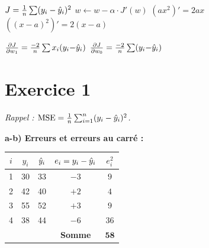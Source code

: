 %






\setlength{\parskip}{2pt}
\setlength{\abovedisplayskip}{5pt}
\setlength{\belowdisplayskip}{5pt}

\begin{tcolorbox}[
    enhanced, colback=ipssiCyan!5, colframe=ipssiCyan!50,
    boxrule=0.8pt, arc=4pt,
    title={\sffamily\bfseries Rappels --- Formules utilis\'{e}es},
    coltitle=white, colbacktitle=ipssiCyan!70,
]
\small
$J = \frac{1}{n}\sum(y_i - \hat{y}_i)^2$ \hfill
$w \leftarrow w - \alpha \cdot J'(w)$ \hfill
$(ax^2)' = 2ax$ \hfill
$((x{-}a)^2)' = 2(x{-}a)$

\smallskip
$\frac{\partial J}{\partial w_1} = \frac{-2}{n}\sum x_i(y_i{-}\hat{y}_i)$ \hfill
$\frac{\partial J}{\partial w_0} = \frac{-2}{n}\sum (y_i{-}\hat{y}_i)$
\end{tcolorbox}

\section*{Exercice 1 \hfill \exofondamental}
\textit{Rappel : $\text{MSE} = \frac{1}{n}\sum_{i=1}^{n}(y_i - \hat{y}_i)^2$.}

\separateur

\textbf{a-b) Erreurs et erreurs au carr\'{e} :}

\begin{center}
\renewcommand{\arraystretch}{1.2}
\begin{tabular}{c|c|c|c|c}
    \toprule
    $i$ & $y_i$ & $\hat{y}_i$ & $e_i = y_i - \hat{y}_i$ & $e_i^2$ \\
    \midrule
    1 & 30 & 33 & $-3$  & $9$ \\
    2 & 42 & 40 & $+2$  & $4$ \\
    3 & 55 & 52 & $+3$  & $9$ \\
    4 & 38 & 44 & $-6$  & $36$ \\
    \midrule
    & & & \textbf{Somme} & $\mathbf{58}$ \\
    \bottomrule
\end{tabular}
\end{center}

